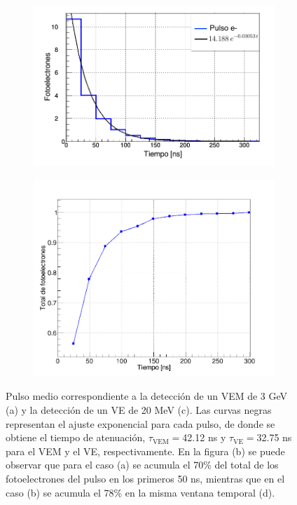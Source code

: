 \documentclass[12pt,oneside,openany,letter]{book}
\begin{document}
\begin{figure}[h!]
\begin{subfigure}{0.45\textwidth}
        \includegraphics[width=\textwidth]{images/vee_tiempo.png}
        \caption{}
        \label{vee_tiempo}
    \end{subfigure}
     \begin{subfigure}{0.4\textwidth}
        \includegraphics[width=\textwidth]{images/VEEcum.png}
        \caption{}
        \label{VEEcum}
    \end{subfigure}
    \caption[Pulso medio correspondiente a la detección de un VEM de 3 GeV y la detección de un VE de 20 MeV]{Pulso medio correspondiente a la detección de un VEM de 3 GeV (a) y la detección de un VE de 20 MeV (c). Las curvas negras representan el ajuste exponencial para cada pulso, de donde se obtiene el tiempo de atenuación, $\tau_{\mathrm{VEM}}=$42.12 ns y $\tau_{\mathrm{VE}}=$32.75 ns para el VEM y el VE, respectivamente. En la figura (b) se puede observar que para el caso (a) se acumula el 70\% del total de los fotoelectrones del pulso en los primeros 50 ns, mientras que en el caso (b) se acumula el 78\% en la misma ventana temporal (d).}\label{Pulsos_mu_e}
\end{figure}
\end{document}

